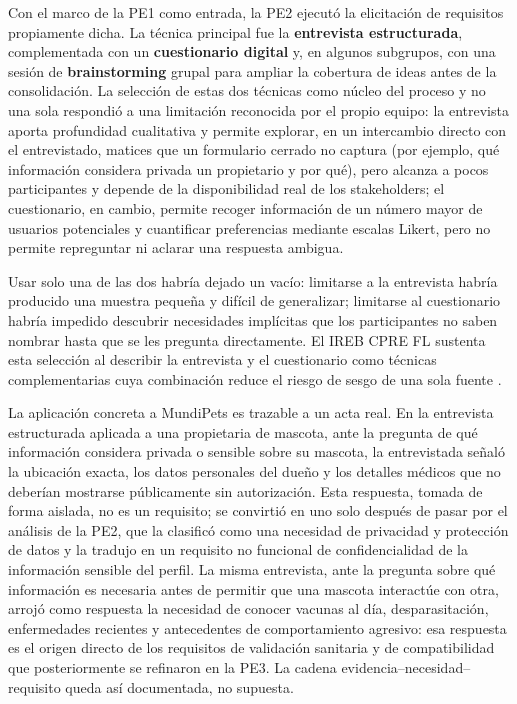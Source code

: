\documentclass[journal,onecolumn]{IEEEtran}
\begin{document}
	Con el marco de la PE1 como entrada, la PE2 ejecutó la elicitación de requisitos
	propiamente dicha. La técnica principal fue la \textbf{entrevista estructurada},
	complementada con un \textbf{cuestionario digital} y, en algunos subgrupos, con una sesión
	de \textbf{brainstorming} grupal para ampliar la cobertura de ideas antes de la
	consolidación. La selección de estas dos técnicas como núcleo del proceso y no una
	sola respondió a una limitación reconocida por el propio equipo: la entrevista aporta
	profundidad cualitativa y permite explorar, en un intercambio directo con el entrevistado,
	matices que un formulario cerrado no captura (por ejemplo, qué información considera
	privada un propietario y por qué), pero alcanza a pocos participantes y depende de la
	disponibilidad real de los stakeholders; el cuestionario, en cambio, permite recoger
	información de un número mayor de usuarios potenciales y cuantificar preferencias
	mediante escalas Likert, pero no permite repreguntar ni aclarar una respuesta ambigua. 
	
	Usar solo una de las dos habría dejado un vacío: limitarse a la entrevista habría producido una
	muestra pequeña y difícil de generalizar; limitarse al cuestionario habría impedido
	descubrir necesidades implícitas que los participantes no saben nombrar hasta que se les
	pregunta directamente. El IREB CPRE FL sustenta esta selección al describir la entrevista y
	el cuestionario como técnicas complementarias cuya combinación reduce el riesgo de sesgo de
	una sola fuente \cite{ireb2026}.
	
	La aplicación concreta a MundiPets es trazable a un acta real. En la entrevista
	estructurada aplicada a una propietaria de mascota, ante la pregunta de qué información
	considera privada o sensible sobre su mascota, la entrevistada señaló la ubicación exacta,
	los datos personales del dueño y los detalles médicos que no deberían mostrarse
	públicamente sin autorización. Esta respuesta, tomada de forma aislada, no es un requisito;
	se convirtió en uno solo después de pasar por el análisis de la PE2, que la clasificó como
	una necesidad de privacidad y protección de datos y la tradujo en un requisito no funcional
	de confidencialidad de la información sensible del perfil. La misma entrevista, ante la
	pregunta sobre qué información es necesaria antes de permitir que una mascota interactúe
	con otra, arrojó como respuesta la necesidad de conocer vacunas al día, desparasitación,
	enfermedades recientes y antecedentes de comportamiento agresivo: esa respuesta es el
	origen directo de los requisitos de validación sanitaria y de compatibilidad que
	posteriormente se refinaron en la PE3. La cadena evidencia--necesidad--requisito queda así
	documentada, no supuesta.
	
\end{document}
